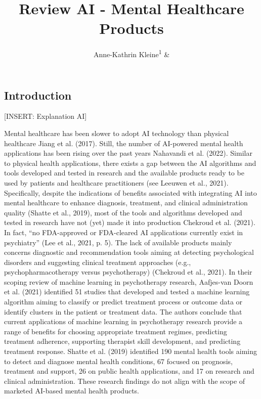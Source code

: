 \documentclass[
  man]{apa7}
\title{Review AI - Mental Healthcare Products}
\author{Anne-Kathrin Kleine\textsuperscript{1} \& \textsuperscript{}}
\date{}
\affiliation{\vspace{0.5cm}\textsuperscript{1} LMU\\\textsuperscript{} }
\begin{document}
\maketitle

\hypertarget{introduction}{%
\subsection{Introduction}\label{introduction}}

{[}INSERT: Explanation AI{]}

Mental healthcare has been slower to adopt AI technology than physical healthcare Jiang et al. (2017).
Still, the number of AI-powered mental health applications has been rising over the past years Nahavandi et al. (2022).
Similar to physical health applications, there exists a gap between the AI algorithms and tools developed and tested in research and the available products ready to be used by patients and healthcare practitioners (see Leeuwen et al., 2021).
Specifically, despite the indications of benefits associated with integrating AI into mental healthcare to enhance diagnosis, treatment, and clinical administration quality (Shatte et al., 2019), most of the tools and algorithms developed and tested in research have not (yet) made it into production Chekroud et al. (2021).
In fact, ``no FDA-approved or FDA-cleared AI applications currently exist in psychiatry'' (Lee et al., 2021, p. 5).
The lack of available products mainly concerns diagnostic and recommendation tools aiming at detecting psychological disorders and suggesting clinical treatment approaches (e.g., psychopharmacotherapy versus psychotherapy) (Chekroud et al., 2021).
In their scoping review of machine learning in psychotherapy research, Aafjes-van Doorn et al. (2021) identified 51 studies that developed and tested a machine learning algorithm aiming to classify or predict treatment process or outcome data or identify clusters in the patient or treatment data.
The authors conclude that current applications of machine learning in psychotherapy research provide a range of benefits for choosing appropriate treatment regimes, predicting treatment adherence, supporting therapist skill development, and predicting treatment response.
Shatte et al. (2019) identified 190 mental health tools aiming to detect and diagnose mental health conditions, 67 focused on prognosis, treatment and support, 26 on public health applications, and 17 on research and clinical administration.
These research findings do not align with the scope of marketed AI-based mental health products.
\end{document}
